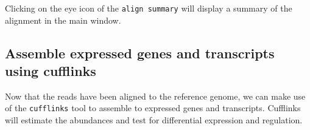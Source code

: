 \documentclass[a4paper,10pt]{article}
\begin{document}
Clicking on the eye icon of the \texttt{\footnotesize{align summary}} will display a summary of the alignment in the main window.\vspace{1em}\\
\setlength\fboxsep{0pt}

\subsection{Assemble expressed genes and transcripts using cufflinks}
Now that the reads have been aligned to the reference genome, we can make use of the \texttt{\footnotesize{cufflinks}} tool to assemble to expressed genes and transcripts.  Cufflinks will estimate the abundances and test for differential expression and regulation.\vspace{1em}\\
\setlength\fboxsep{0pt}\vspace{1em}\\
\setlength\fboxsep{0.5em}
\newsavebox\topbox
\end{document}
